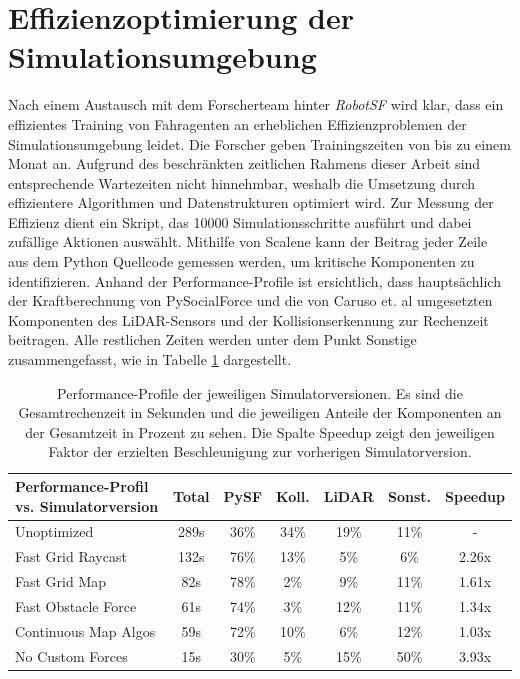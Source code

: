 
\section{Effizienzoptimierung der Simulationsumgebung} \label{sec:SimEffOpt}
Nach einem Austausch mit dem Forscherteam hinter \emph{RobotSF} wird klar, dass ein
effizientes Training von Fahragenten an erheblichen Effizienzproblemen der
Simulationsumgebung leidet. Die Forscher geben Trainingszeiten von bis zu einem Monat an.
Aufgrund des beschränkten zeitlichen Rahmens dieser Arbeit sind entsprechende Wartezeiten
nicht hinnehmbar, weshalb die Umsetzung durch effizientere Algorithmen und Datenstrukturen
optimiert wird. Zur Messung der Effizienz dient ein Skript, das 10000 Simulationsschritte
ausführt und dabei zufällige Aktionen auswählt. Mithilfe von Scalene
\cite{berger2022triangulating} kann der Beitrag jeder Zeile aus dem Python Quellcode
gemessen werden, um kritische Komponenten zu identifizieren. Anhand der Performance-Profile
ist ersichtlich, dass hauptsächlich der Kraftberechnung von PySocialForce und die
von Caruso et. al umgesetzten Komponenten des LiDAR-Sensors und der Kollisionserkennung
zur Rechenzeit beitragen. Alle restlichen Zeiten werden unter dem Punkt
\glqq{}Sonstige\grqq{} zusammengefasst, wie in Tabelle \ref{tab:SimEffOpt} dargestellt.\\

\begin{table}
\centering
\begin{tabular}{ |p{4cm}||c|c|c|c|c|c| }
 \hline
 Performance-Profil vs. Simulatorversion & Total & PySF & Koll. & LiDAR & Sonst. & Speedup \\
 \hline \hline
 Unoptimized          & 289s & 36\% & 34\% & 19\% & 11\% &  - \\ \hline
 Fast Grid Raycast    & 132s & 76\% & 13\% &  5\% &  6\% & 2.26x \\ \hline
 Fast Grid Map        &  82s & 78\% &  2\% &  9\% & 11\% & 1.61x \\ \hline
 Fast Obstacle Force  &  61s & 74\% &  3\% & 12\% & 11\% & 1.34x \\ \hline
 Continuous Map Algos &  59s & 72\% & 10\% &  6\% & 12\% & 1.03x \\ \hline
 No Custom Forces     &  15s & 30\% &  5\% & 15\% & 50\% & 3.93x \\ \hline
\end{tabular}
\caption{Performance-Profile der jeweiligen Simulatorversionen. Es sind die Gesamtrechenzeit
in Sekunden und die jeweiligen Anteile der Komponenten an der Gesamtzeit in Prozent zu sehen.
Die Spalte \glqq{}Speedup\grqq{} zeigt den jeweiligen Faktor der erzielten Beschleunigung
zur vorherigen Simulatorversion.}
\label{tab:SimEffOpt}
\end{table}

